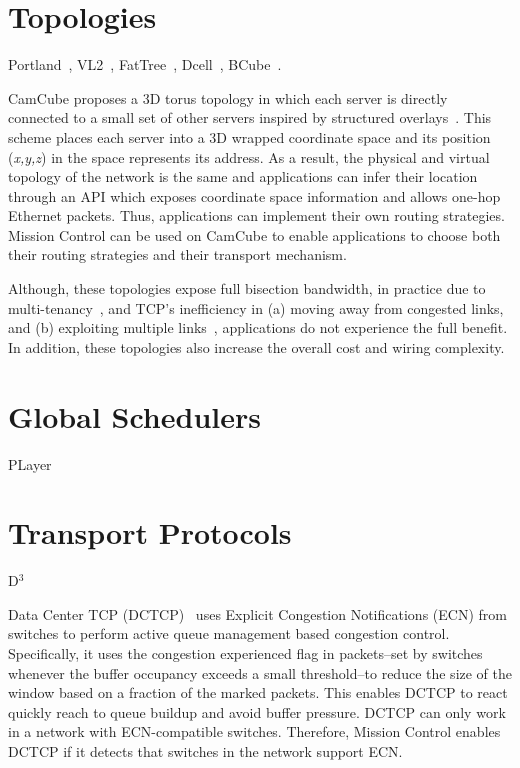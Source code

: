 \documentclass[a4paper,12pt,twoside,openright]{report}
\begin{document}
\section{Topologies}
Portland~\cite{NiranjanMysore:2009:PSF}, VL2~\cite{Greenberg:2009:VSF},
FatTree~\cite{Al-Fares:2008:SCD}, Dcell~\cite{Guo:2008:DSF},
BCube~\cite{Guo:2009:BHP}.

CamCube proposes a 3D torus topology in which each server is directly connected
to a small set of other servers inspired by structured
overlays~\cite{Abu-Libdeh:2010:SRF}. This scheme places each server into a 3D
wrapped coordinate space and its position (\emph{x,y,z}) in the space represents
its address. As a result, the physical and virtual topology of the network is
the same and applications can infer their location through an API which exposes
coordinate space information and allows one-hop Ethernet packets. Thus,
applications can implement their own routing strategies. Mission Control can be
used on CamCube to enable applications to choose both their routing strategies
and their transport mechanism.

Although, these topologies expose full bisection bandwidth, in practice due to
multi-tenancy~\cite{Costa:2012:CEI}, and TCP's inefficiency in (a) moving away
from congested links, and (b) exploiting multiple links~\cite{Raiciu:2011:IDP},
applications do not experience the full benefit. In addition, these topologies
also increase the overall cost and wiring complexity.

\section{Global Schedulers}
PLayer~\cite{Joseph:2008:PSL}

\section{Transport Protocols}
D$^3$~\cite{Wilson:2011:BNL}

Data Center TCP (DCTCP)~\cite{Alizadeh:2010:DCT} uses Explicit Congestion
Notifications (ECN) from switches to perform active queue management based
congestion control. Specifically, it uses the congestion experienced flag in
packets--set by switches whenever the buffer occupancy exceeds a small
threshold--to reduce the size of the window based on a fraction of the marked
packets. This enables DCTCP to react quickly reach to queue buildup and avoid
buffer pressure. DCTCP can only work in a network with ECN-compatible switches.
Therefore, Mission Control enables DCTCP if it detects that switches in the
network support ECN.
\end{document}
